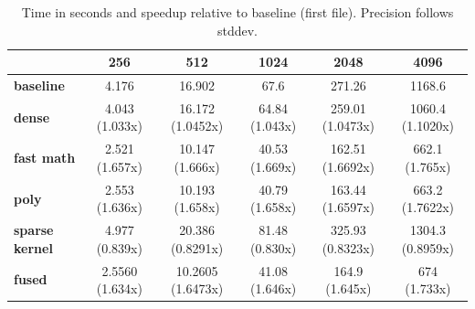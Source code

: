 \begin{table}[H]
\centering
\begin{tabular}{|l|c|c|c|c|c|}
\hline
 & \textbf{256} & \textbf{512} & \textbf{1024} & \textbf{2048} & \textbf{4096} \\
\hline
\textbf{baseline} 
& 4.176
& 16.902
& 67.6
& 271.26
& 1168.6 \\

\textbf{dense} 
& 4.043 (1.033x)
& 16.172 (1.0452x)
& 64.84 (1.043x)
& 259.01 (1.0473x)
& 1060.4 (1.1020x) \\

\textbf{fast math} 
& 2.521 (1.657x)
& 10.147 (1.666x)
& 40.53 (1.669x)
& 162.51 (1.6692x)
& 662.1 (1.765x) \\

\textbf{poly} 
& 2.553 (1.636x)
& 10.193 (1.658x)
& 40.79 (1.658x)
& 163.44 (1.6597x)
& 663.2 (1.7622x) \\

\textbf{sparse kernel} 
& 4.977 (0.839x)
& 20.386 (0.8291x)
& 81.48 (0.830x)
& 325.93 (0.8323x)
& 1304.3 (0.8959x) \\

\textbf{fused} 
& 2.5560 (1.634x)
& 10.2605 (1.6473x)
& 41.08 (1.646x)
& 164.9 (1.645x)
& 674 (1.733x) \\

\hline
\end{tabular}
\caption{Time in seconds and speedup relative to baseline (first file). Precision follows stddev.}
\end{table}
